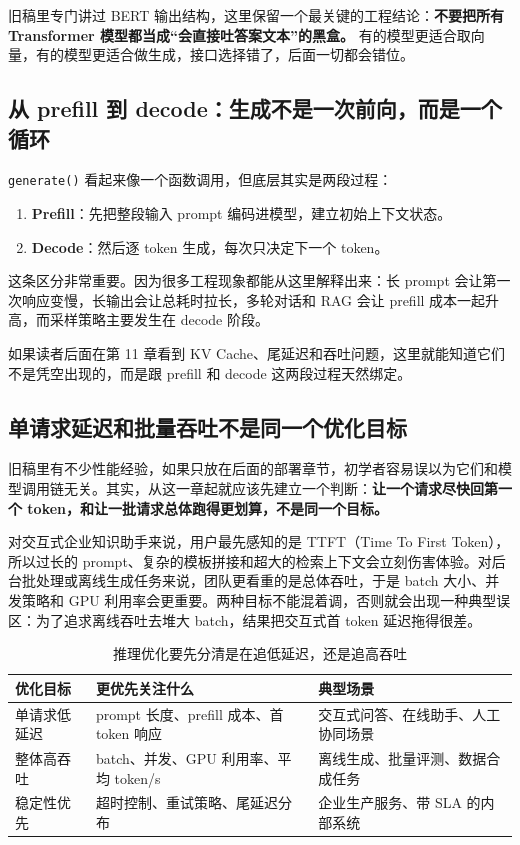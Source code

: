 旧稿里专门讲过 BERT 输出结构，这里保留一个最关键的工程结论：\textbf{不要把所有 Transformer 模型都当成“会直接吐答案文本”的黑盒。} 有的模型更适合取向量，有的模型更适合做生成，接口选择错了，后面一切都会错位。

\subsection{从 prefill 到 decode：生成不是一次前向，而是一个循环}
\texttt{generate()} 看起来像一个函数调用，但底层其实是两段过程：
\begin{enumerate}
  \item \textbf{Prefill}：先把整段输入 prompt 编码进模型，建立初始上下文状态。
  \item \textbf{Decode}：然后逐 token 生成，每次只决定下一个 token。
\end{enumerate}

这条区分非常重要。因为很多工程现象都能从这里解释出来：长 prompt 会让第一次响应变慢，长输出会让总耗时拉长，多轮对话和 RAG 会让 prefill 成本一起升高，而采样策略主要发生在 decode 阶段。

如果读者后面在第 11 章看到 KV Cache、尾延迟和吞吐问题，这里就能知道它们不是凭空出现的，而是跟 prefill 和 decode 这两段过程天然绑定。

\subsection{单请求延迟和批量吞吐不是同一个优化目标}
旧稿里有不少性能经验，如果只放在后面的部署章节，初学者容易误以为它们和模型调用链无关。其实，从这一章起就应该先建立一个判断：\textbf{让一个请求尽快回第一个 token，和让一批请求总体跑得更划算，不是同一个目标。}

对交互式企业知识助手来说，用户最先感知的是 TTFT（Time To First Token），所以过长的 prompt、复杂的模板拼接和超大的检索上下文会立刻伤害体验。对后台批处理或离线生成任务来说，团队更看重的是总体吞吐，于是 batch 大小、并发策略和 GPU 利用率会更重要。两种目标不能混着调，否则就会出现一种典型误区：为了追求离线吞吐去堆大 batch，结果把交互式首 token 延迟拖得很差。

\begin{table}[H]
\centering
\small
\begin{tabularx}{\textwidth}{>{\raggedright\arraybackslash}p{2.8cm}>{\raggedright\arraybackslash}p{3.1cm}>{\raggedright\arraybackslash}X}
\toprule
\textbf{优化目标} & \textbf{更优先关注什么} & \textbf{典型场景} \\
\midrule
单请求低延迟 & prompt 长度、prefill 成本、首 token 响应 & 交互式问答、在线助手、人工协同场景 \\
整体高吞吐 & batch、并发、GPU 利用率、平均 token/s & 离线生成、批量评测、数据合成任务 \\
稳定性优先 & 超时控制、重试策略、尾延迟分布 & 企业生产服务、带 SLA 的内部系统 \\
\bottomrule
\end{tabularx}
\caption{推理优化要先分清是在追低延迟，还是追高吞吐}
\label{tab:latency-vs-throughput}
\end{table}

